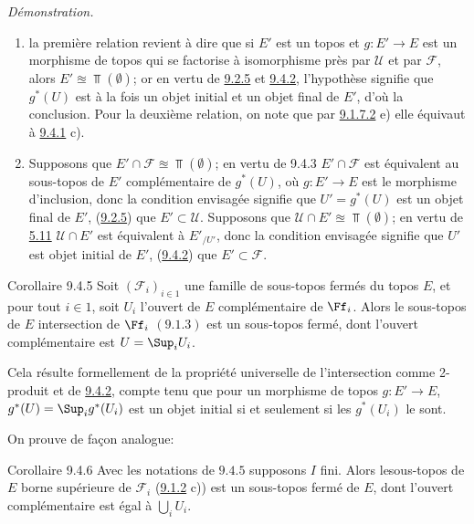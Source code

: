 \noindent \emph{Démonstration.}
\begin{enumerate}
\renewcommand{\theenumi}{\alph{enumi}}
\renewcommand{\labelenumi}{\theenumi)}
\item la première relation revient à dire que si $E'$ est un topos et
$g:E'\rightarrow E$ est un morphisme de topos qui se factorise à
isomorphisme près par $\mathcal{U}$ et par $\mathcal{F}$, alors
$E'\approxeq \Top(∅)$; or en vertu de \hyperref[IV.subsubsec9.2.5]{9.2.5} et
\hyperref[IV.prop9.4.2]{9.4.2}, l'hypothèse signifie que $g^{\ast}(U)$ est à la
fois un objet initial et un objet final de $E'$, d'où la conclusion.
Pour la deuxième relation, on note que par \hyperref[IV.exer9.1.7.2]{9.1.7.2} e)
elle équivaut à \hyperref[IV.prop9.4.1]{9.4.1} c).

\item Supposons que $E'\cap \mathcal{F}\approxeq \Top(∅)$; en vertu de
9.4.3 $E'\cap \mathcal{F}$ est équivalent au sous-topos de $E'$
    complémentaire de $g^{\ast}(U)$, où $g:E'\rightarrow E$ est le
    morphisme d'inclusion, donc la condition envisagée signifie que
    $U'=g^{\ast}(U)$ est un objet final de $E'$, \ie (\hyperref[IV.subsubsec9.2.5]{9.2.5}) que
    $E'\subset \mathcal{U}$. Supposons que $\mathcal{U}\cap E'\approxeq
    \Top(∅)$; en vertu de \hyperref[IV.prop5.11]{5.11} $\mathcal{U}\cap E'$ est équivalent à
    $E'_{/U'}$, donc la condition envisagée signifie que $U'$ est
    objet initial de $E'$, \ie (\hyperref[IV.prop9.4.2]{9.4.2}) que $E'\subset \mathcal{F}$.
\end{enumerate}

\begin{enonce*}{Corollaire 9.4.5}
Soit $(\mathcal{F}_i)_{i\in 1}$ une famille de sous-topos fermés du
topos $E$, et pour tout $i\in 1$, soit $U_i$ l'ouvert de $E$
complémentaire de $\Ff_i$. Alors le sous-topos de $E$ intersection
de $\Ff_i$ $(\hyperref[IV.prop9.1.3]{9.1.3})$ est un sous-topos fermé, dont
l'ouvert complémentaire est $U=\Sup_i U_i$.
\end{enonce*}

Cela résulte formellement de la propriété universelle de
l'intersection comme 2-produit et de \hyperref[IV.prop9.4.2]{9.4.2}, compte tenu
que pour un morphisme de topos $g:E'\rightarrow E$,
$g^{\ast}(U)=\Sup_i g^{\ast}(U_i)$ est un objet initial si et
seulement si les $g^{\ast}(U_i)$ le sont.

On prouve de façon analogue:

\begin{enonce*}{Corollaire 9.4.6}
Avec les notations de  $9.4.5$ supposons $I$ fini. Alors
le\pageoriginale sous-topos de $E$ borne supérieure de $\mathcal{F}_{i}$ {\rm
(\hyperref[IV.rem9.1.2]{9.1.2} c))} est un sous-topos fermé de $E$, dont
l'ouvert complémentaire est égal à $\bigcup_i U_i$.
\end{enonce*}

